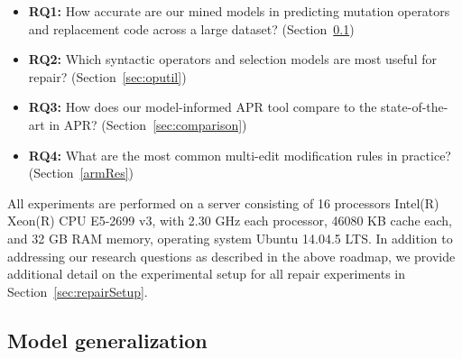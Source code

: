 \documentclass[conference]{IEEEtran}
\newcommand{\todo}[1]
  {{\scriptsize \textbf{\color{red} {#1}}}}
\begin{document}
\begin{itemize}
\item \textbf{RQ1:} How accurate are our mined models in predicting mutation
  operators and replacement code across a large dataset?
(Section~\ref{sec:generalize})
\item \textbf{RQ2:} Which syntactic operators and selection models are most
  useful for repair? (Section~\ref{sec:oputil})
\item \textbf{RQ3:} How does our model-informed APR tool compare to the
    state-of-the-art in APR? (Section~\ref{sec:comparison})
\item \textbf{RQ4:} What are the most common multi-edit modification rules in
    practice? (Section~\ref{armRes})
\end{itemize}


All experiments are performed on a server 
consisting of 16 processors Intel(R) Xeon(R) CPU E5-2699 v3, with 2.30 GHz each
processor, 46080 KB cache each, and 32 GB RAM memory, operating system Ubuntu 
14.04.5 LTS.  In addition to addressing our research questions as described in
the above roadmap, we provide additional detail on the experimental setup for
all repair experiments in Section~\ref{sec:repairSetup}. 

\subsection{Model generalization}
\label{sec:generalize}
  

\end{document}
